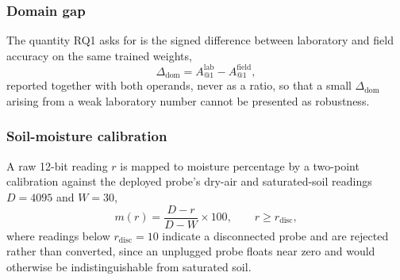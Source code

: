 \documentclass[journal]{IEEEtran}
\begin{document}
\subsubsection{Domain gap}
The quantity RQ1 asks for is the signed difference between laboratory and
field accuracy on the same trained weights,
\begin{equation}
\Delta_{\mathrm{dom}} = A^{\mathrm{lab}}_{@1} - A^{\mathrm{field}}_{@1},
\label{eq:gap}
\end{equation}
reported together with both operands, never as a ratio, so that a small
$\Delta_{\mathrm{dom}}$ arising from a weak laboratory number cannot be
presented as robustness.

\subsubsection{Soil-moisture calibration}
A raw 12-bit reading $r$ is mapped to moisture percentage by a two-point
calibration against the deployed probe's dry-air and saturated-soil
readings $D=4095$ and $W=30$,
\begin{equation}
m(r) = \frac{D-r}{D-W}\times 100, \qquad r \ge r_{\mathrm{disc}},
\label{eq:soil}
\end{equation}
where readings below $r_{\mathrm{disc}}=10$ indicate a disconnected probe
and are rejected rather than converted, since an unplugged probe floats
near zero and would otherwise be indistinguishable from saturated soil.
\end{document}
